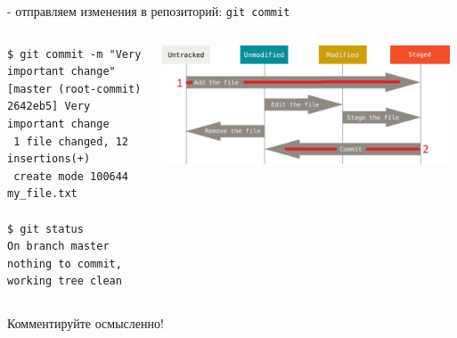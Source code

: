 \documentclass[presentation]{beamer}
\begin{document}
\begin{frame}[fragile,label={sec:orgf81247d}]{- отправляем изменения в репозиторий:}
 \alert{\texttt{git commit}}

\begin{columns}
\begin{column}{0.65\columnwidth}
\begin{verbatim}
$ git commit -m "Very important change"
[master (root-commit) 2642eb5] Very important change
 1 file changed, 12 insertions(+)
 create mode 100644 my_file.txt

$ git status
On branch master
nothing to commit, working tree clean
\end{verbatim}
\end{column}

\begin{column}{0.35\columnwidth}
\begin{center}
\includegraphics[width=0.98\textwidth]{./01_vcs_01_git_file_states_01_add.png}
\end{center}
\end{column}
\end{columns}
\end{frame}

\begin{frame}[label={sec:org2560c68}]{ Комментируйте осмысленно!}

\end{frame}
\end{document}
